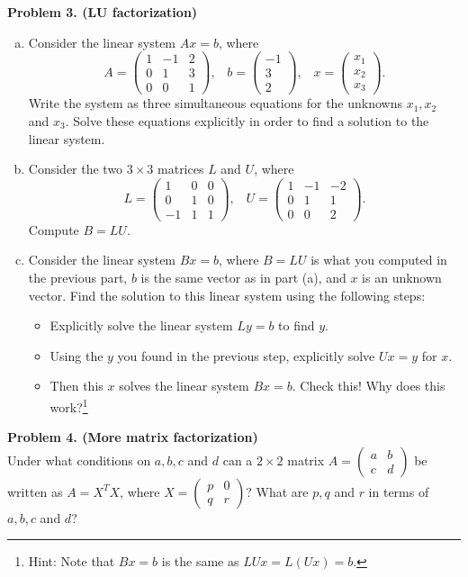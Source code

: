 \documentclass[11pt]{article}
\begin{document}
\noindent \textbf{Problem 3. (LU factorization)}\\
\begin{enumerate}[(a)]
\item Consider the linear system $Ax = b$, where
$$A = \begin{pmatrix} 1 & -1 & 2 \\ 0 & 1 & 3 \\ 0 & 0 & 1 \end{pmatrix}, \;\;\; b = \begin{pmatrix} -1 \\ 3 \\ 2 \end{pmatrix}, \;\;\; x = \begin{pmatrix} x_1 \\ x_2 \\ x_3 \end{pmatrix}.$$
Write the system as three simultaneous equations for the unknowns $x_1, x_2$ and $x_3$. Solve these equations explicitly in order to find a solution to the linear system.
\item Consider the two $3\times 3$ matrices $L$ and $U$, where
$$L = \begin{pmatrix} 1 & 0 & 0 \\ 0 & 1 & 0 \\ -1 & 1 & 1 \end{pmatrix}, \;\;\; U = \begin{pmatrix} 1 & -1 & -2 \\ 0 & 1 & 1 \\0 & 0 & 2 \end{pmatrix}.$$
Compute $B = LU$.
\item Consider the linear system $Bx = b$, where $B=LU$ is what you computed in the previous part, $b$ is the same vector as in part (a), and $x$ is an unknown vector. Find the solution to this linear system using the following steps:
\begin{itemize}
\item Explicitly solve the  linear system $Ly = b$ to find $y$.
\item Using the $y$ you found in the previous step, explicitly solve $Ux = y$ for $x$.
\item Then this $x$ solves the linear system $Bx = b$. Check this! Why does this work?\footnote{Hint: Note that $Bx = b$ is the same as $LUx = L(Ux) = b$.}
\end{itemize}
\end{enumerate}

\newpage 

\noindent \textbf{Problem 4. (More matrix factorization)}\\
Under what conditions on $a,b,c$ and $d$ can a $2\times 2$ matrix $A=\begin{pmatrix} a & b \\ c & d\end{pmatrix}$ be written as $A=X^TX$, where $X=\begin{pmatrix} p & 0 \\ q & r \end{pmatrix}$? What are $p,q$ and $r$ in terms of $a,b,c$ and $d$?
\end{document}
